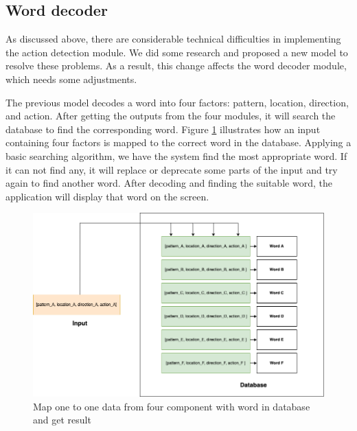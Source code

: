 \subsection{Word decoder}













As discussed above, there are considerable technical difficulties in implementing the action detection module. We did some research and proposed a new model to resolve these problems. As a result, this change affects the word decoder module, which needs some adjustments.

The previous model decodes a word into four factors: pattern, location, direction, and action. After getting the outputs from the four modules, it will search the database to find the corresponding word. Figure \ref{fig:Chap4-MapWord} illustrates how an input containing four factors is mapped to the correct word in the database. Applying a basic searching algorithm, we have the system find the most appropriate word. If it can not find any, it will replace or deprecate some parts of the input and try again to find another word. After decoding and finding the suitable word, the application will display that word on the screen.

\begin{figure}[H]
	\centering
	\includegraphics[width=\textwidth]{img/Chap4/MapWord.png}
	\caption{Map one to one data from four component with word in database and get result}
	\label{fig:Chap4-MapWord}
\end{figure}

